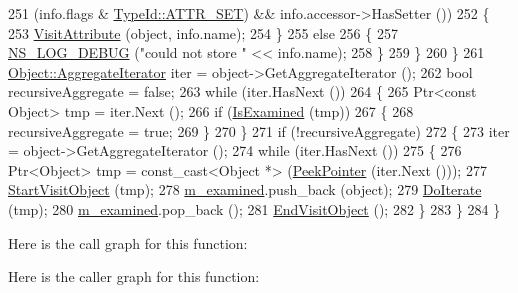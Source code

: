 \begin{DoxyCode}
251               (info.flags & \hyperlink{classns3_1_1TypeId_a3ab7b43b95f96391c514d609ca60e542aa860aabfc04fde3f5fd95529cb706d9e}{TypeId::ATTR\_SET}) && info.accessor->HasSetter ())
252             \{
253               \hyperlink{classns3_1_1AttributeIterator_a43d0c36078a9b5c233102bc9daf5fed3}{VisitAttribute} (\textcolor{keywordtype}{object}, info.name);
254             \}
255           \textcolor{keywordflow}{else}
256             \{
257               \hyperlink{group__logging_ga413f1886406d49f59a6a0a89b77b4d0a}{NS\_LOG\_DEBUG} (\textcolor{stringliteral}{"could not store "} << info.name);
258             \}
259         \}
260     \}
261   \hyperlink{classns3_1_1Object_a361444a63ee78c28fb448ce71d005d47}{Object::AggregateIterator} iter = \textcolor{keywordtype}{object}->GetAggregateIterator ();
262   \textcolor{keywordtype}{bool} recursiveAggregate = \textcolor{keyword}{false};
263   \textcolor{keywordflow}{while} (iter.HasNext ())
264     \{
265       Ptr<const Object> tmp = iter.Next ();
266       \textcolor{keywordflow}{if} (\hyperlink{classns3_1_1AttributeIterator_a2875dc7947e54711f8529f59ee9e510e}{IsExamined} (tmp))
267         \{
268           recursiveAggregate = \textcolor{keyword}{true};
269         \}
270     \}
271   \textcolor{keywordflow}{if} (!recursiveAggregate)
272     \{
273       iter = \textcolor{keywordtype}{object}->GetAggregateIterator ();
274       \textcolor{keywordflow}{while} (iter.HasNext ())
275         \{
276           Ptr<Object> tmp = \textcolor{keyword}{const\_cast<}Object *\textcolor{keyword}{>} (\hyperlink{namespacens3_af2a7557fe9afdd98d8f6f8f6e412cf5a}{PeekPointer} (iter.Next ()));
277           \hyperlink{classns3_1_1AttributeIterator_a2702b2e4a022569d53ed28d263631d39}{StartVisitObject} (tmp);
278           \hyperlink{classns3_1_1AttributeIterator_ab43bac2d9c3ddcc7aa92ab5b727741dc}{m\_examined}.push\_back (\textcolor{keywordtype}{object});
279           \hyperlink{classns3_1_1AttributeIterator_a01259d50f232e21c9c605547e26b34bb}{DoIterate} (tmp);
280           \hyperlink{classns3_1_1AttributeIterator_ab43bac2d9c3ddcc7aa92ab5b727741dc}{m\_examined}.pop\_back ();
281           \hyperlink{classns3_1_1AttributeIterator_a7dce7fbd38eac6791990661c03ca1ff3}{EndVisitObject} ();
282         \}
283     \}
284 \}
\end{DoxyCode}


Here is the call graph for this function\+:




Here is the caller graph for this function\+:



